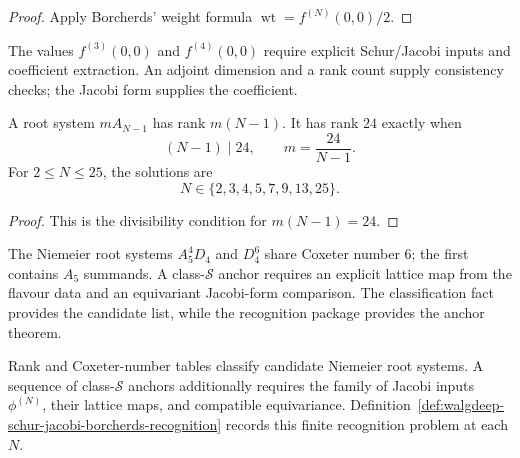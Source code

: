 \begin{proof}
Apply Borcherds' weight formula
\(\operatorname{wt}=f^{(N)}(0,0)/2\).
\end{proof}

\begin{remark}[The \(N=3,4\) coefficient obligation]
\label{rem:walgdeep-W17-borcherds-kN-computation}
\ClaimStatusOpen
The values \(f^{(3)}(0,0)\) and \(f^{(4)}(0,0)\) require explicit
Schur/Jacobi inputs and coefficient extraction.  An adjoint
dimension and a rank count supply consistency checks; the Jacobi
form supplies the coefficient.
\end{remark}

\begin{theorem}
\label{thm:walgdeep-divisor-rule}
\ClaimStatusProvedHere
A root system \(mA_{N-1}\) has rank \(m(N-1)\).  It has rank \(24\)
exactly when
\[
(N-1)\mid24,\qquad m=\frac{24}{N-1}.
\]
For \(2\le N\le25\), the solutions are
\[
N\in\{2,3,4,5,7,9,13,25\}.
\]
\end{theorem}

\begin{proof}
This is the divisibility condition for \(m(N-1)=24\).
\end{proof}

\begin{remark}
\label{rem:walgdeep-W18-6D4-reanchoring}
\label{thm:walgdeep-N6-reanchoring}
\label{thm:walgdeep-N6-reanchor-A5-4-D4}
\ClaimStatusOpen
The Niemeier root systems \(A_5^4D_4\) and \(D_4^6\) share Coxeter
number \(6\); the first contains \(A_5\) summands.  A class-\(\mathcal
S\) anchor requires an explicit lattice map from the flavour data and
an equivariant Jacobi-form comparison.  The classification fact
provides the candidate list, while the recognition package provides
the anchor theorem.
\end{remark}

\begin{remark}
\label{thm:walgdeep-N7-N8-re-anchor}
\label{thm:walgdeep-substitute-anchors}
\label{rem:walgdeep-substitute-anchors}
\label{rem:walgdeep-coxeter-void-regime}
\ClaimStatusOpen
Rank and Coxeter-number tables classify candidate Niemeier root
systems.  A sequence of class-\(\mathcal S\) anchors additionally
requires the family of Jacobi inputs \(\phi^{(N)}\), their lattice
maps, and compatible equivariance.  Definition~\ref{def:walgdeep-schur-jacobi-borcherds-recognition}
records this finite recognition problem at each \(N\).
\end{remark}

